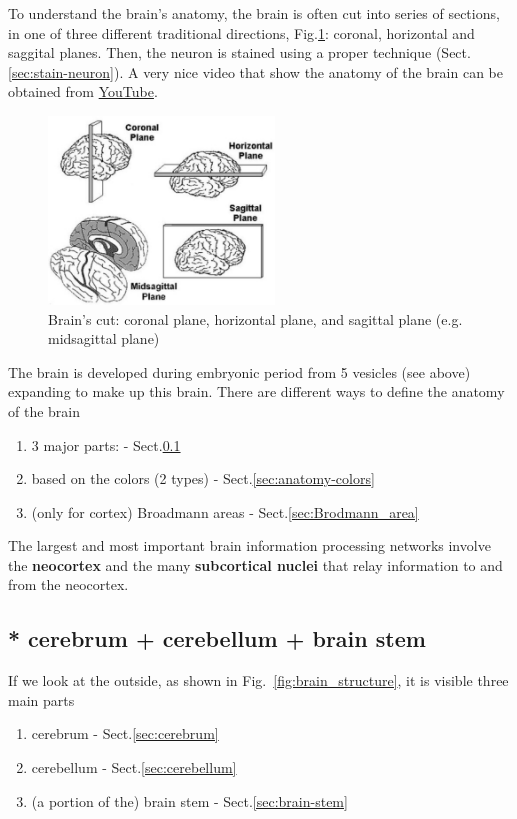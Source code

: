 To understand the brain's anatomy, the brain is often cut into series of
sections, in one of three different traditional directions,
Fig.\ref{fig:brain-cut}: coronal, horizontal and saggital planes. Then, the
neuron is stained using a proper technique (Sect.\ref{sec:stain-neuron}).
A very nice video that show the anatomy of the brain can be obtained
from \href{http://www.youtube.com/watch?v=HVGlfcP3ATI}{YouTube}.

\begin{figure}[hbt]
  \centerline{\includegraphics[height=5cm,
    angle=0]{./images/brain-cut.eps}}
  \caption{Brain's cut: coronal plane, horizontal plane, and sagittal plane
  (e.g. midsagittal plane)}
\label{fig:brain-cut}
\end{figure}

The brain is developed during embryonic period from 5 vesicles (see above)
expanding to make up this brain. There are different ways to define the anatomy
of the brain
\begin{enumerate}
  \item 3 major parts: - Sect.\ref{sec:anatomy-3parts} 
  
  \item based on the colors (2 types) - Sect.\ref{sec:anatomy-colors}

  \item (only for cortex) Broadmann areas - Sect.\ref{sec:Brodmann_area}

\end{enumerate}

The largest and most important brain information processing networks involve the
{\bf neocortex} and the many {\bf subcortical nuclei} that relay information to
and from the neocortex.

\subsection{* cerebrum + cerebellum + brain stem}
\label{sec:anatomy-3parts}

If we look at the outside, as shown in Fig.~\ref{fig:brain_structure}, it
is visible three main parts
\begin{enumerate}
  \item cerebrum - Sect.\ref{sec:cerebrum}
  \item cerebellum - Sect.\ref{sec:cerebellum}
  \item (a portion of the) brain stem - Sect.\ref{sec:brain-stem}
\end{enumerate}

